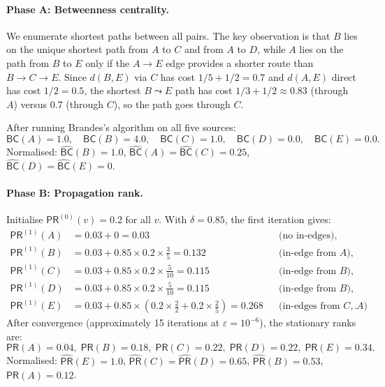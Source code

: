 \documentclass[11pt]{article}
\newcommand{\BC}{\mathsf{BC}}               %
\newcommand{\PRank}{\mathsf{PR}}            %
\begin{document}
\paragraph{Phase A: Betweenness centrality.}
We enumerate shortest paths between all pairs.  The key observation is
that $B$ lies on the unique shortest path from $A$ to $C$ and from $A$
to $D$, while $A$ lies on the path from $B$ to $E$ only if the
$A \to E$ edge provides a shorter route than $B \to C \to E$.  Since
$d(B, E)$ via $C$ has cost $1/5 + 1/2 = 0.7$ and $d(A, E)$ direct has
cost $1/2 = 0.5$, the shortest $B \leadsto E$ path has cost
$1/3 + 1/2 \approx 0.83$ (through $A$) versus $0.7$ (through $C$), so
the path goes through $C$.

After running Brandes's algorithm on all five sources:
\[
  \BC(A) = 1.0, \quad
  \BC(B) = 4.0, \quad
  \BC(C) = 1.0, \quad
  \BC(D) = 0.0, \quad
  \BC(E) = 0.0.
\]
Normalised: $\widehat{\BC}(B) = 1.0$, $\widehat{\BC}(A)
= \widehat{\BC}(C) = 0.25$, $\widehat{\BC}(D) = \widehat{\BC}(E) = 0$.

\paragraph{Phase B: Propagation rank.}
Initialise $\PRank^{(0)}(v) = 0.2$ for all $v$.  With $\delta = 0.85$,
the first iteration gives:
\begin{align*}
  \PRank^{(1)}(A) &= 0.03 + 0 = 0.03
    && \text{(no in-edges)}, \\
  \PRank^{(1)}(B) &= 0.03 + 0.85 \times 0.2 \times \tfrac{3}{5}
    = 0.132
    && \text{(in-edge from $A$)}, \\
  \PRank^{(1)}(C) &= 0.03 + 0.85 \times 0.2 \times \tfrac{5}{10}
    = 0.115
    && \text{(in-edge from $B$)}, \\
  \PRank^{(1)}(D) &= 0.03 + 0.85 \times 0.2 \times \tfrac{5}{10}
    = 0.115
    && \text{(in-edge from $B$)}, \\
  \PRank^{(1)}(E) &= 0.03 + 0.85 \times (0.2 \times \tfrac{2}{2}
    + 0.2 \times \tfrac{2}{5})
    = 0.268
    && \text{(in-edges from $C$, $A$)}.
\end{align*}
After convergence (approximately 15 iterations at $\varepsilon = 10^{-6}$),
the stationary ranks are:
\[
  \PRank(A) = 0.04,\;
  \PRank(B) = 0.18,\;
  \PRank(C) = 0.22,\;
  \PRank(D) = 0.22,\;
  \PRank(E) = 0.34.
\]
Normalised: $\widehat{\PRank}(E) = 1.0$, $\widehat{\PRank}(C)
= \widehat{\PRank}(D) = 0.65$, $\widehat{\PRank}(B) = 0.53$,
$\widehat{\PRank}(A) = 0.12$.
\end{document}
